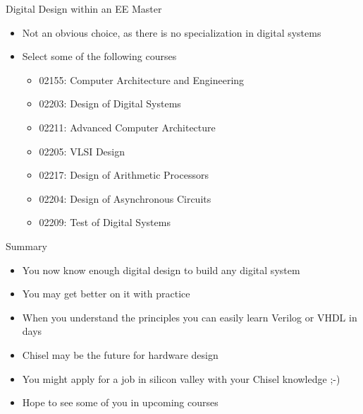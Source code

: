 \begin{frame}[fragile]{Digital Design within an EE Master}
\begin{itemize}
\item Not an obvious choice, as there is no specialization in digital systems
\item Select some of the following courses
\begin{itemize}
\item 02155: Computer Architecture and Engineering
\item 02203: Design of Digital Systems
\item 02211: Advanced Computer Architecture
\item 02205: VLSI Design
\item 02217: Design of Arithmetic Processors
\item 02204: Design of Asynchronous Circuits
\item 02209: Test of Digital Systems
\end{itemize}
\end{itemize}
\end{frame}

\begin{frame}[fragile]{Summary}
\begin{itemize}
\item You now know enough digital design to build any digital system
\item You may get better on it with practice
\item When you understand the principles you can easily learn Verilog or VHDL in days
\item Chisel may be the future for hardware design
\item You might apply for a job in silicon valley with your Chisel knowledge ;-)
\item Hope to see some of you in upcoming courses
\end{itemize}
\end{frame}





